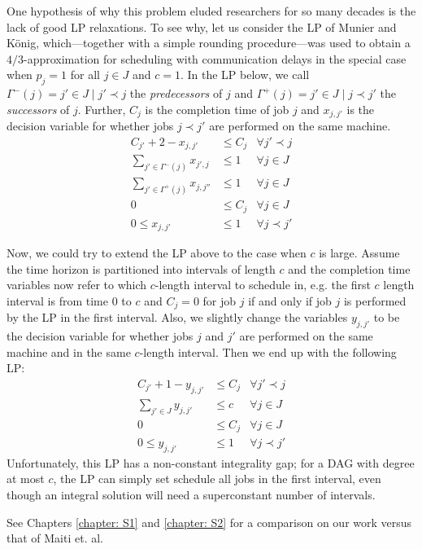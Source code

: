 One hypothesis of why this problem eluded researchers for so many decades is the lack of good LP relaxations. 
To see why, let us consider the LP of Munier and K\"{o}nig, which---together with a simple rounding procedure---was used to 
obtain a $4/3$-approximation for scheduling with communication delays in the special case when $p_j=1$ for all $j \in J$ and $c=1$. 
In the LP below, we call $\Gamma^{-}(j) = {j' \in J \mid j' \prec j}$ the \emph{predecessors} of $j$ and 
$\Gamma^{+}(j) = {j' \in J \mid j \prec j'}$ the \emph{successors} of $j$. 
Further, $C_j$ is the completion time of job $j$ and $x_{j,j'}$ is the decision variable for whether jobs $j \prec j'$ are performed on the same machine.
\begin{align*}
C_{j'}+2-x_{j,j'} &\leq C_j  &\forall j' \prec j \\
\sum_{j' \in \Gamma^{-}(j)} x_{j',j}&\leq 1 &\forall j \in J \\
\sum_{j' \in \Gamma^{+}(j)} x_{j,j''}&\leq 1 &\forall j \in J \\
0&\leq C_j   &\forall j \in J \\ 
0 \leq x_{j,j'} &\leq 1  &\forall j \prec j'
\end{align*}

Now, we could try to extend the LP above to the case when $c$ is large.
Assume the time horizon is partitioned into intervals of length $c$ and the completion time variables now refer to which $c$-length interval to schedule in,
e.g. the first $c$ length interval is from time 0 to $c$ and $C_j=0$ for job $j$
if and only if job $j$ is performed by the LP in the first interval. 
Also, we slightly change the variables $y_{j,j'}$ to be the decision variable for whether jobs $j$ and $j'$ are performed on the same machine and in the same $c$-length interval.
Then we end up with the following LP:
\begin{align*}
  C_{j'}+1-y_{j,j'}&\leq C_j  &\forall j' \prec j \\
  \sum_{j' \in J } y_{j,j'}&\leq c &\forall j \in J \\
  0&\leq C_j   &\forall j \in J \\ 
  0 \leq y_{j,j'} &\leq 1  &\forall j \prec j'
\end{align*}
Unfortunately, this LP has a non-constant integrality gap; 
for a DAG with degree at most $c$, the LP can simply set schedule all jobs in the first interval, even though an integral solution will need a superconstant number of intervals.

See Chapters \ref{chapter: S1} and \ref{chapter: S2} for a comparison on our work versus that of Maiti et. al.

